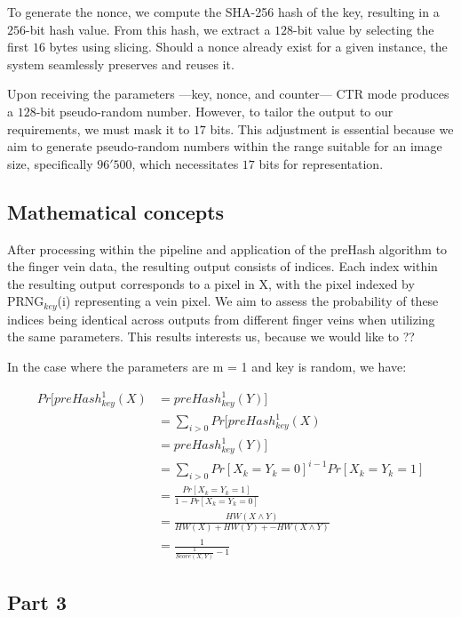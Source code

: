 To generate the nonce, we compute the SHA-256 hash of the key, resulting in a $256$-bit hash value. From this hash, we extract a $128$-bit value by selecting the first $16$ bytes using slicing. Should a nonce already exist for a given instance, the system seamlessly preserves and reuses it. 

Upon receiving the parameters —key, nonce, and counter— CTR mode produces a $128$-bit pseudo-random number. However, to tailor the output to our requirements, we must mask it to $17$ bits. This adjustment is essential because we aim to generate pseudo-random numbers within the range suitable for an image size, specifically $96'500$, which necessitates $17$ bits for representation. 






\subsection{Mathematical concepts}

After processing within the pipeline and application of the preHash algorithm to the finger vein data, the resulting output consists of indices. Each index within the resulting output corresponds to a pixel in X, with the pixel indexed by PRNG$_{key}$(i) representing a vein pixel. We aim to assess the probability of these indices being identical across outputs from different finger veins when utilizing the same parameters. This results interests us, because we would like to ??


In the case where the parameters are m = 1 and key is random, we have: 

\begin{equation}
    \begin{aligned}
        Pr[preHash_{key}^1(X) &= preHash_{key}^1(Y)]\\
        &= \sum_{i > 0} Pr[preHash_{key}^1(X)\\
        &= preHash_{key}^1(Y)]\\
        &= \sum_{i > 0} Pr[X_k = Y_k = 0]^{i - 1} Pr[X_k = Y_k = 1]\\
        &= \frac{Pr[X_k = Y_k = 1]}{1 - Pr[X_k = Y_k = 0]}\\
        &= \frac{HW(X \land Y)}{HW(X) + HW(Y) + - HW(X \land Y)}\\
        &= \frac{1}{\frac{1}{Score(X, Y)} - 1}
    \end{aligned}
\end{equation}




\subsection{Part 3}